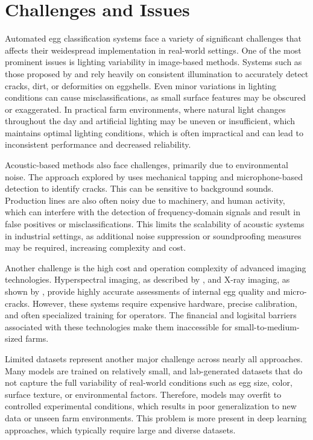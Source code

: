 \documentclass[conference]{IEEEtran}
\begin{document}
	\section{Challenges and Issues}
	
	Automated egg classification systems face a variety of significant challenges that affects their weidespread implementation in real-world settings. One of the most prominent issues is lighting variability in image-based methods. Systems such as those proposed by \cite{zhang2020cnn} and \cite{singh2022vision} rely heavily on consistent illumination to accurately detect cracks, dirt, or deformities on eggshells. Even minor variations in lighting conditions can cause misclassifications, as small surface features may be obscured or exaggerated. In practical farm environments, where natural light changes throughout the day and artificial lighting may be uneven or insufficient, which maintains optimal lighting conditions, which is often impractical and can lead to inconsistent performance and decreased reliability.
	
	Acoustic-based methods also face challenges, primarily due to environmental noise. The approach explored by \cite{wang2021acoustic} uses mechanical tapping and microphone-based detection to identify cracks. This can be sensitive to background sounds. Production lines are also often noisy due to machinery, and human activity, which can interfere with the detection of frequency-domain signals and result in false positives or misclassifications. This limits the scalability of acoustic systems in industrial settings, as additional noise suppression or soundproofing measures may be required, increasing complexity and cost.
	
	Another challenge is the high cost and operation complexity of advanced imaging technologies. Hyperspectral imaging, as described by \cite{li2021hsi}, and X-ray imaging, as shown by \cite{kumar2023xray}, provide highly accurate assessments of internal egg quality and micro-cracks. However, these systems require expensive hardware, precise calibration, and often specialized training for operators. The financial and logisital barriers associated with these technologies make them inaccessible for small-to-medium-sized farms.
	
	Limited datasets represent another major challenge across nearly all approaches. Many models are trained on relatively small, and lab-generated datasets that do not capture the full variability of real-world conditions such as egg size, color, surface texture, or environmental factors. Therefore, models may overfit to controlled experimental conditions, which results in poor generalization to new data or unseen farm environments. This problem is more present in deep learning approaches, which typically require large and diverse datasets.
	
\end{document}
